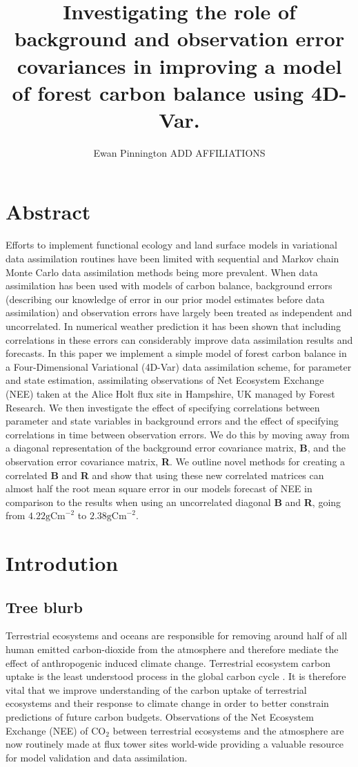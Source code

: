 \documentclass[11pt]{article}
\title{Investigating the role of background and observation error covariances in improving a model of forest carbon balance using 4D-Var.}
\author{Ewan Pinnington ADD AFFILIATIONS}
\begin{document}
\maketitle

\section*{Abstract}

Efforts to implement functional ecology and land surface models in variational data assimilation routines have been limited with sequential and Markov chain Monte Carlo data assimilation methods being more prevalent. When data assimilation has been used with models of carbon balance, background errors (describing our knowledge of error in our prior model estimates before data assimilation) and observation errors have largely been treated as independent and uncorrelated. In numerical weather prediction it has been shown that including correlations in these errors can considerably improve data assimilation results and forecasts. In this paper we implement a simple model of forest carbon balance in a Four-Dimensional Variational (4D-Var) data assimilation scheme, for parameter and state estimation, assimilating observations of Net Ecosystem Exchange (NEE) taken at the Alice Holt flux site in Hampshire, UK managed by Forest Research. We then investigate the effect of specifying correlations between parameter and state variables in background errors and the effect of specifying correlations in time between observation errors. We do this by moving away from a diagonal representation of the background error covariance matrix, \textbf{B}, and the observation error covariance matrix, \textbf{R}. We outline novel methods for creating a correlated \textbf{B} and \textbf{R} and show that using these new correlated matrices can almost half the root mean square error in our models forecast of NEE in comparison to the results when using an uncorrelated diagonal \textbf{B} and \textbf{R}, going from $4.22\text{gCm}^{-2}$ to $2.38\text{gCm}^{-2}$.      

\section{Introdution}

\subsection{Tree blurb}
Terrestrial ecosystems and oceans are responsible for removing around half of all human emitted carbon-dioxide from the atmosphere and therefore mediate the effect of anthropogenic induced climate change. Terrestrial ecosystem carbon uptake is the least understood process in the global carbon cycle \citep{ciais2014carbon}. It is therefore vital that we improve understanding of the carbon uptake of terrestrial ecosystems and their response to climate change in order to better constrain predictions of future carbon budgets. Observations of the Net Ecosystem Exchange (NEE) of CO$_{2}$ between terrestrial ecosystems and the atmosphere are now routinely made at flux tower sites world-wide \citep{baldocchi2008turner} providing a valuable resource for model validation and data assimilation.
\end{document}
